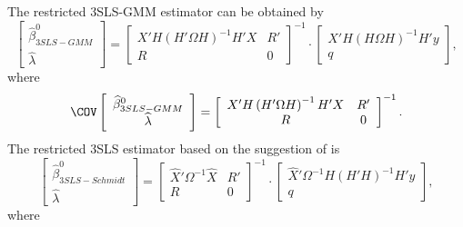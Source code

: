The restricted 3SLS-GMM estimator can be obtained by
\begin{equation}
   \left[ \begin{array}{c}
      \widehat{\beta}^0_{3SLS-GMM} \\ \widehat{\lambda}
   \end{array} \right]
   =
   \left[ \begin{array}{cc}
      X' H \left( H' \Omega H \right)^{-1} H' X & R' \\ 
      R & 0
   \end{array} \right]^{-1}
   \cdot
   \left[ \begin{array}{c}
      X' H \left( H \Omega H \right)^{-1} H' y \\ q 
   \end{array} \right] ,
   \label{eq:3slsGmmR}
\end{equation}
where
\begin{equation}
   \COV
   \left[ \begin{array}{c}
      \widehat{\beta}^0_{3SLS-GMM} \\ \widehat{\lambda}
   \end{array} \right] 
   = 
   \left[ \begin{array}{cc}
      X' H \left( H' \Omega H \right)^{-1} H' X & R' \\ 
      R & 0
   \end{array} \right]^{-1} .
\end{equation}
The restricted 3SLS estimator based on the suggestion of
\cite{schmidt90} is
\begin{equation}
   \left[ \begin{array}{c}
      \widehat{\beta}^0_{3SLS-Schmidt} \\ \widehat{\lambda}
   \end{array} \right]
   =
   \left[ \begin{array}{cc}
      \widehat{X}' \Omega^{-1} \widehat{X} & R' \\ 
      R & 0
   \end{array} \right]^{-1}
   \cdot
   \left[ \begin{array}{c}
      \widehat{X}' \Omega^{-1} H \left( H' H \right)^{-1} H' y \\ q 
   \end{array} \right] ,
   \label{eq:3slsSchmidtR}
\end{equation}
where
